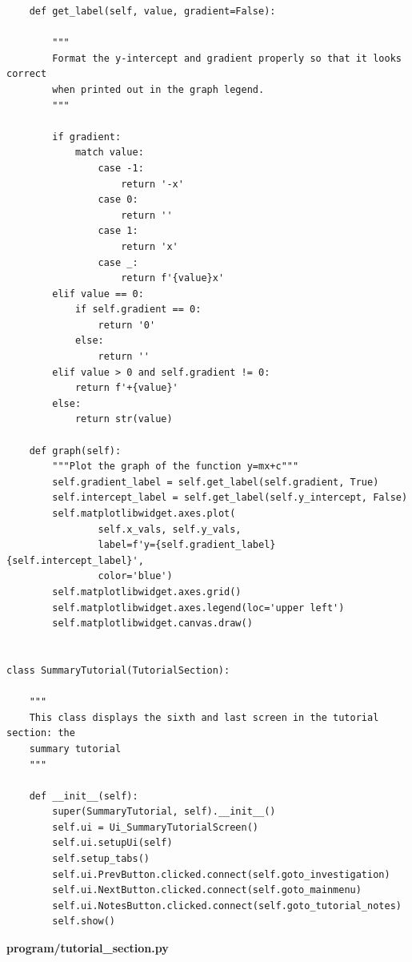 \documentclass{article}
\begin{document}
\begin{lstlisting}
    def get_label(self, value, gradient=False):

        """
        Format the y-intercept and gradient properly so that it looks correct
        when printed out in the graph legend.
        """

        if gradient:
            match value:
                case -1:
                    return '-x'
                case 0:
                    return ''
                case 1:
                    return 'x'
                case _:
                    return f'{value}x'
        elif value == 0:
            if self.gradient == 0:
                return '0'
            else:
                return ''
        elif value > 0 and self.gradient != 0:
            return f'+{value}'
        else:
            return str(value)

    def graph(self):
        """Plot the graph of the function y=mx+c"""
        self.gradient_label = self.get_label(self.gradient, True)
        self.intercept_label = self.get_label(self.y_intercept, False)
        self.matplotlibwidget.axes.plot(
                self.x_vals, self.y_vals,
                label=f'y={self.gradient_label}{self.intercept_label}',
                color='blue')
        self.matplotlibwidget.axes.grid()
        self.matplotlibwidget.axes.legend(loc='upper left')
        self.matplotlibwidget.canvas.draw()


class SummaryTutorial(TutorialSection):

    """
    This class displays the sixth and last screen in the tutorial section: the
    summary tutorial
    """

    def __init__(self):
        super(SummaryTutorial, self).__init__()
        self.ui = Ui_SummaryTutorialScreen()
        self.ui.setupUi(self)
        self.setup_tabs()
        self.ui.PrevButton.clicked.connect(self.goto_investigation)
        self.ui.NextButton.clicked.connect(self.goto_mainmenu)
        self.ui.NotesButton.clicked.connect(self.goto_tutorial_notes)
        self.show()
\end{lstlisting}


\textbf{program/tutorial\_section.py}
\end{document}
